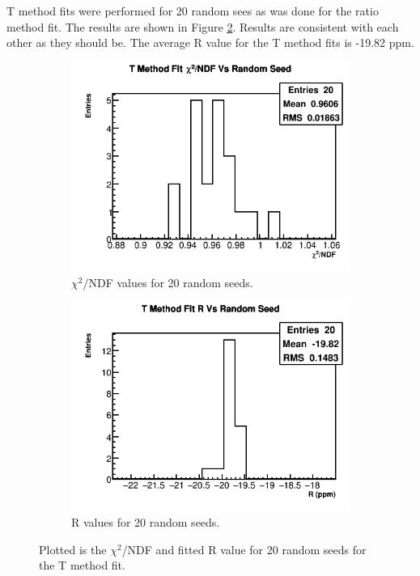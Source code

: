 \clearpage

	T method fits were performed for 20 random sees as was done for the ratio method fit. The results are shown in Figure \ref{fig:RandomSeedsTMethod}. Results are consistent with each other as they should be. The average R value for the T method fits is -19.82 ppm.

	\begin{figure}[]
	\centering
	    \begin{subfigure}[t]{0.45\textwidth}
		    \centering
			\includegraphics[width=\textwidth]{TMethod_Chi2NDF_Vs_Iter_Canv_hist}
		    \caption{$\chi^{2}$/NDF values for 20 random seeds.}
	    \end{subfigure}
	    \begin{subfigure}[t]{0.45\textwidth}
		    \centering
			\includegraphics[width=\textwidth]{TMethod_R_Vs_Iter_Canv_hist.png}
		    \caption{R values for 20 random seeds.}
		\label{Subfig:RVsRandomSeedTMethod}
	    \end{subfigure}%
	\caption[RandomSeedsTMethod]{Plotted is the $\chi^{2}$/NDF and fitted R value for 20 random seeds for the T method fit.}
	\label{fig:RandomSeedsTMethod}
	\end{figure}

